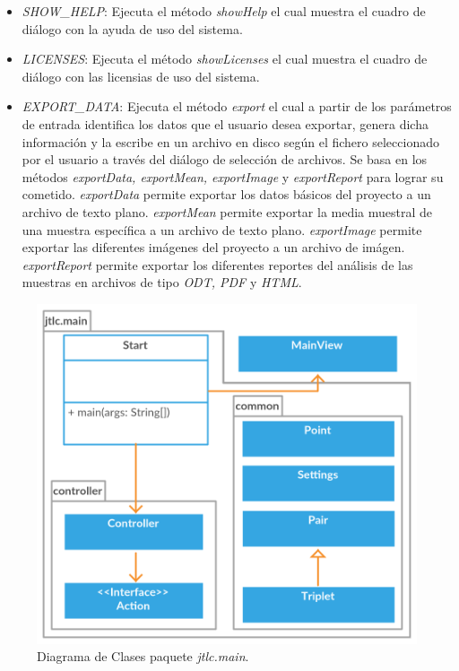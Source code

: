 \begin{itemize}
	\item \textit{SHOW\_HELP}: Ejecuta el m\'etodo \textit{showHelp} el cual muestra el cuadro de di\'alogo con la ayuda de uso del sistema.
	\item \textit{LICENSES}: Ejecuta el m\'etodo \textit{showLicenses} el cual muestra el cuadro de di\'alogo con las licensias de uso del sistema.
	\item \textit{EXPORT\_DATA}: Ejecuta el m\'etodo \textit{export} el cual a partir de los par\'ametros de entrada identifica los datos que el usuario desea exportar, genera dicha informaci\'on y la escribe en un archivo en disco seg\'un el fichero seleccionado por el usuario a trav\'es del di\'alogo de selecci\'on de archivos. Se basa en los m\'etodos \textit{exportData, exportMean, exportImage} y \textit{exportReport} para lograr su cometido. \textit{exportData} permite exportar los datos b\'asicos del proyecto a un archivo de texto plano. \textit{exportMean} permite exportar la media muestral de una muestra espec\'ifica a un archivo de texto plano. \textit{exportImage} permite exportar las diferentes im\'agenes del proyecto a un archivo de im\'agen. \textit{exportReport} permite exportar los diferentes reportes del an\'alisis de las muestras en archivos de tipo \textit{ODT, PDF} y \textit{HTML}.
\end{itemize}

\begin{figure}[H]
	\centering
	\vspace{-0.5cm}
	\includegraphics[width=325pt]{imagenes-jtlc/main}
	\centering
	\vspace{-0.5cm}
	\caption{Diagrama de Clases paquete \textit{jtlc.main}.}
	\label{fig:mainDiagrama}
\end{figure}

